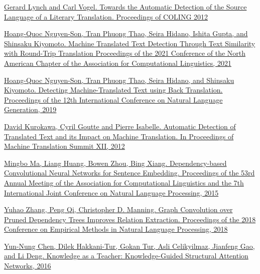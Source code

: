 \documentclass[twocolumn]{article}
\begin{document}

\begin{thebibliography}{99}

   \href{https://aclanthology.org/C12-2076.pdf}{Gerard Lynch and Carl Vogel. Towards the Automatic Detection of the Source Language of a Literary Translation. Proceedings of COLING 2012}

   \href{https://aclanthology.org/2021.naacl-main.462.pdf }{Hoang-Quoc Nguyen-Son, Tran Phuong Thao, Seira Hidano, Ishita Gupta, and Shinsaku Kiyomoto. Machine Translated Text Detection Through Text Similarity with Round-Trip Translation Proceedings of the 2021 Conference of the North American Chapter of the Association for Computational Linguistics, 2021}

   \href{https://arxiv.org/pdf/1910.06558.pdf}{Hoang-Quoc Nguyen-Son, Tran Phuong Thao, Seira Hidano, and Shinsaku Kiyomoto. Detecting Machine-Translated Text using Back Translation. Proceedings of the 12th International Conference on Natural Language Generation, 2019}

   \href{https://www.cs.cmu.edu/~dkurokaw/publications/MTS-2009-Kurokawa.pdf}{David Kurokawa, Cyril Goutte and Pierre Isabelle. Automatic Detection of Translated Text and its Impact on Machine Translation. In Proceedings of Machine Translation Summit XII, 2012}

   \href{https://aclanthology.org/P15-2029.pdf}{Mingbo Ma, Liang Huang, Bowen Zhou, Bing Xiang. Dependency-based Convolutional Neural Networks for Sentence Embedding. Proceedings of the 53rd Annual Meeting of the Association for Computational Linguistics and the 7th International Joint Conference on Natural Language Processing, 2015}

   \href{https://aclanthology.org/D18-1244/}{Yuhao Zhang, Peng Qi, Christopher D. Manning. Graph Convolution over Pruned Dependency Trees Improves Relation Extraction. Proceedings of the 2018 Conference on Empirical Methods in Natural Language Processing, 2018}

   \href{https://arxiv.org/pdf/1609.03286.pdf
}{Yun-Nung Chen, Dilek Hakkani-Tur, Gokan Tur, Asli Celikyilmaz, Jianfeng Gao, and Li Deng. Knowledge as a Teacher: Knowledge-Guided Structural Attention Networks, 2016}


\end{thebibliography}
\end{document}
